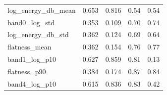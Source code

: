\documentclass[11pt,a4paper]{article}
\begin{document}
\begin{center}
\begin{longtable}{>{\raggedright\arraybackslash}p{4.20cm}>{\raggedleft\arraybackslash}p{2.55cm}>{\raggedleft\arraybackslash}p{2.55cm}>{\raggedleft\arraybackslash}p{2.55cm}>{\raggedleft\arraybackslash}p{2.55cm}}
\hspace{0pt}log\_\allowbreak{}energy\_\allowbreak{}db\_\allowbreak{}mean & \hspace{0pt}0.653 & \hspace{0pt}0.816 & \hspace{0pt}0.54 & \hspace{0pt}0.54\\
\hspace{0pt}band0\_\allowbreak{}log\_\allowbreak{}std & \hspace{0pt}0.353 & \hspace{0pt}0.109 & \hspace{0pt}0.70 & \hspace{0pt}0.74\\
\hspace{0pt}log\_\allowbreak{}energy\_\allowbreak{}db\_\allowbreak{}std & \hspace{0pt}0.362 & \hspace{0pt}0.124 & \hspace{0pt}0.69 & \hspace{0pt}0.64\\
\hspace{0pt}flatness\_\allowbreak{}mean & \hspace{0pt}0.362 & \hspace{0pt}0.154 & \hspace{0pt}0.76 & \hspace{0pt}0.77\\
\hspace{0pt}band1\_\allowbreak{}log\_\allowbreak{}p10 & \hspace{0pt}0.627 & \hspace{0pt}0.859 & \hspace{0pt}0.81 & \hspace{0pt}0.13\\
\hspace{0pt}flatness\_\allowbreak{}p90 & \hspace{0pt}0.384 & \hspace{0pt}0.174 & \hspace{0pt}0.87 & \hspace{0pt}0.84\\
\hspace{0pt}band4\_\allowbreak{}log\_\allowbreak{}p10 & \hspace{0pt}0.615 & \hspace{0pt}0.836 & \hspace{0pt}0.83 & \hspace{0pt}0.42\\

\end{longtable}
\end{center}
\end{document}
